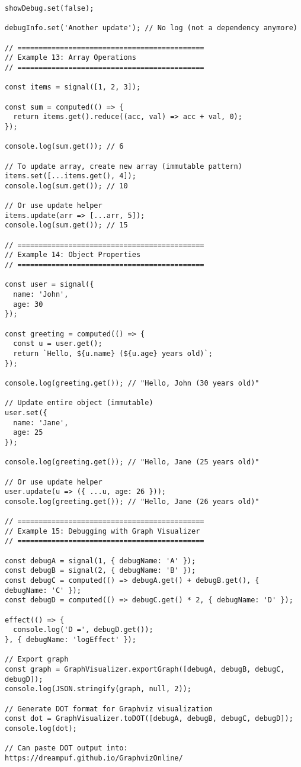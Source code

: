 \documentclass[11pt]{article}
\begin{document}
\begin{verbatim}
showDebug.set(false);

debugInfo.set('Another update'); // No log (not a dependency anymore)

// ============================================
// Example 13: Array Operations
// ============================================

const items = signal([1, 2, 3]);

const sum = computed(() => {
  return items.get().reduce((acc, val) => acc + val, 0);
});

console.log(sum.get()); // 6

// To update array, create new array (immutable pattern)
items.set([...items.get(), 4]);
console.log(sum.get()); // 10

// Or use update helper
items.update(arr => [...arr, 5]);
console.log(sum.get()); // 15

// ============================================
// Example 14: Object Properties
// ============================================

const user = signal({
  name: 'John',
  age: 30
});

const greeting = computed(() => {
  const u = user.get();
  return `Hello, ${u.name} (${u.age} years old)`;
});

console.log(greeting.get()); // "Hello, John (30 years old)"

// Update entire object (immutable)
user.set({
  name: 'Jane',
  age: 25
});

console.log(greeting.get()); // "Hello, Jane (25 years old)"

// Or use update helper
user.update(u => ({ ...u, age: 26 }));
console.log(greeting.get()); // "Hello, Jane (26 years old)"

// ============================================
// Example 15: Debugging with Graph Visualizer
// ============================================

const debugA = signal(1, { debugName: 'A' });
const debugB = signal(2, { debugName: 'B' });
const debugC = computed(() => debugA.get() + debugB.get(), { debugName: 'C' });
const debugD = computed(() => debugC.get() * 2, { debugName: 'D' });

effect(() => {
  console.log('D =', debugD.get());
}, { debugName: 'logEffect' });

// Export graph
const graph = GraphVisualizer.exportGraph([debugA, debugB, debugC, debugD]);
console.log(JSON.stringify(graph, null, 2));

// Generate DOT format for Graphviz visualization
const dot = GraphVisualizer.toDOT([debugA, debugB, debugC, debugD]);
console.log(dot);

// Can paste DOT output into: https://dreampuf.github.io/GraphvizOnline/
\end{verbatim}
\end{document}
